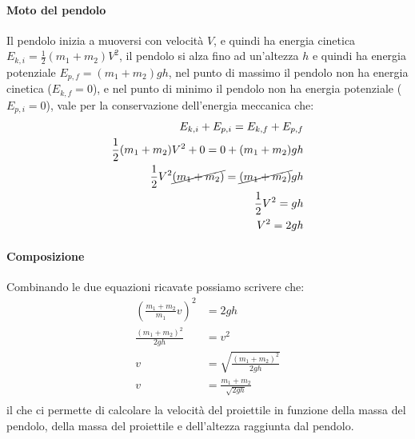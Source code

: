         \paragraph{Moto del pendolo} Il pendolo inizia a muoversi con velocità $V$, e quindi ha energia cinetica $E_{k,i} = \frac{1}{2}(m_1+m_2)V^2$, il pendolo si alza fino ad un'altezza $h$ e quindi ha energia potenziale $E_{p,f} = (m_1+m_2)gh$, nel punto di massimo il pendolo non ha energia cinetica ($E_{k,f} = 0$), e nel punto di minimo il pendolo non ha energia potenziale ($E_{p,i} = 0$), vale per la conservazione dell'energia meccanica che:  
        \begin{align*}
            E_{k,i} + E_{p,i} = E_{k,f} + E_{p,f}\\ 
            \frac{1}{2}(m_1+m_2)V^2 + 0 = 0 + (m_1+m_2)gh\\
            \frac{1}{2}V^2\cancel{(m_1+m_2)} = \cancel{(m_1+m_2)}gh\\
            \frac{1}{2}V^2 = gh\\
            V^2 = 2gh\\
        \end{align*}
        \paragraph{Composizione}   
            Combinando le due equazioni ricavate possiamo scrivere che:  
                \begin{align*}
                    \left(\frac{m_1+m_2}{m_1}v\right)^2 &= 2gh\\
                    \frac{(m_1+m_2)^2}{2gh} &= v^2\\
                    v &= \sqrt{\frac{(m_1+m_2)^2}{2gh}}\\
                    v &= \frac{m_1+m_2}{\sqrt{2gh}}\\
                \end{align*}
            il che ci permette di calcolare la velocità del proiettile in funzione della massa del pendolo, della massa del proiettile e dell'altezza raggiunta dal pendolo.

